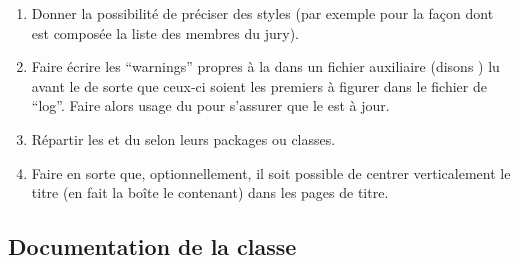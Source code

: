 \begin{enumerate}
\item Donner la possibilité de préciser des styles (par exemple pour la façon
  dont est composée la liste des membres du jury).
\item Faire écrire les \foreignquote{english}{warnings} propres à la \yatcl{}
  dans un fichier auxiliaire (disons ) lu avant le  de sorte que ceux-ci
  soient les premiers à figurer dans le fichier de
  \foreignquote{english}{log}. Faire alors usage du 
  pour s'assurer que le  est à jour.
\item Répartir les  et  du
   selon leurs packages ou classes.
\item Faire en sorte que, optionnellement, il soit possible de centrer
  verticalement le titre (en fait la boîte le contenant) dans les pages de
  titre.
\end{enumerate}

\subsection{Documentation de la classe}
\label{sec:documentation-de-la-ult}

